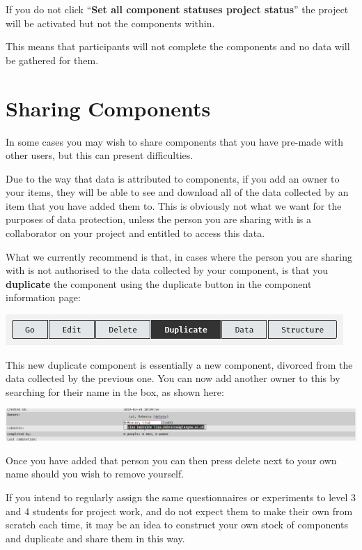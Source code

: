 \documentclass[]{book}
\begin{document}
\begin{warning}
If you do not click ``\textbf{Set all component statuses project
status}'' the project will be activated but not the components within.

This means that participants will not complete the components and no
data will be gathered for them.
\end{warning}

\section*{Sharing Components}\label{sharing-components}

In some cases you may wish to share components that you have pre-made
with other users, but this can present difficulties.

Due to the way that data is attributed to components, if you add an
owner to your items, they will be able to see and download all of the
data collected by an item that you have added them to. This is obviously
not what we want for the purposes of data protection, unless the person
you are sharing with is a collaborator on your project and entitled to
access this data.

What we currently recommend is that, in cases where the person you are
sharing with is not authorised to the data collected by your component,
is that you \textbf{duplicate} the component using the duplicate button
in the component information page:

\includegraphics{images/screenshots/duplicate.png}

This new duplicate component is essentially a new component, divorced
from the data collected by the previous one. You can now add another
owner to this by searching for their name in the box, as shown here:

\includegraphics{images/screenshots/add_owner.png}

Once you have added that person you can then press delete next to your
own name should you wish to remove yourself.

\begin{info}
If you intend to regularly assign the same questionnaires or experiments
to level 3 and 4 students for project work, and do not expect them to
make their own from scratch each time, it may be an idea to construct
your own stock of components and duplicate and share them in this way.
\end{info}
\end{document}
